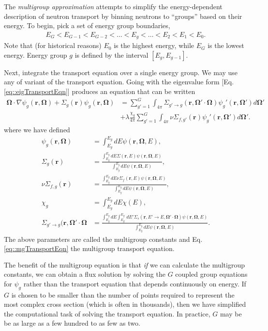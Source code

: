 \documentclass[11pt]{article}
\renewcommand\vec{\mathbf}
\begin{document}
The \emph{multigroup approximation} attempts to simplify the energy-dependent description of neutron transport by binning neutrons to ``groups'' based on their energy.  To begin, pick a set of energy group boundaries, 
\begin{align}
  E_G < E_{G-1} < E_{G-2} < \hdots < E_g < \hdots < E_2 < E_1 < E_0.
\end{align}
Note that (for historical reasons) \(E_0\) is the highest energy, while \(E_G\) is the lowest energy.  Energy group \(g\) is defined by the interval \([E_g, E_{g-1}]\).  

Next, integrate the transport equation over a single energy group.  We may use any of variant of the transport equation.  Going with the eigenvalue form [Eq. \eqref{eq::eigTransportEqn}] produces an equation that can be written
\begin{align}
  \vec{\Omega} \cdot \nabla \psi_g(\vec{r},\vec{\Omega})
  + \Sigma_g(\vec{r}) \psi_g(\vec{r},\vec{\Omega})
  &= \sum_{g'=1}^G \int_{4\pi} \Sigma_{g'\rightarrow g}(\vec{r}, \vec{\Omega}'\cdot\vec{\Omega}) \psi_g'(\vec{r},\vec{\Omega}') d\vec{\Omega}'\\
  &+ \lambda\frac{\chi_g}{4\pi} \sum_{g'=1}^G \int_{4\pi} \nu\Sigma_{f,g'}(\vec{r}) \psi_g'(\vec{r},\vec{\Omega}') d\vec{\Omega}'.
  \label{eq::mgTransportEqn}
\end{align}
where we have defined
\begin{align}
  \psi_g(\vec{r},\vec{\Omega}) &= \int_{E_g}^{E_g} dE \psi(\vec{r},\vec{\Omega},E), \\
  \Sigma_g(\vec{r}) &= \frac{\int_{E_g}^{E_g} dE \Sigma(\vec{r},E) \psi(\vec{r},\vec{\Omega},E)}{\int_{E_g}^{E_g} dE \psi(\vec{r},\vec{\Omega},E)}, \\
  \nu\Sigma_{f,g}(\vec{r}) &= \frac{\int_{E_g}^{E_g} dE \nu\Sigma_f(\vec{r},E) \psi(\vec{r},\vec{\Omega},E)}{\int_{E_g}^{E_g} dE \psi(\vec{r},\vec{\Omega},E)}, \\
  \chi_g &=  \int_{E_g}^{E_g} dE \chi(E), \\
  \Sigma_{g'\rightarrow g}(\vec{r}, \vec{\Omega}'\cdot\vec{\Omega} &= 
    \frac{\int_{E_g}^{E_g} dE \int_{E_{g'}}^{E_{g'}} dE' \Sigma_s(\vec{r},E' \rightarrow E, \vec{\Omega}'\cdot\vec{\Omega}) \psi(\vec{r},\vec{\Omega},E)}{\int_{E_g}^{E_g} dE \psi(\vec{r},\vec{\Omega},E)}.
\end{align}
The above parameters are called the multigroup constants and Eq. \eqref{eq::mgTransportEqn} the multigroup transport equation.  

The benefit of the multigroup equation is that \emph{if} we can calculate the multigroup constants, we can obtain a flux solution by solving the \(G\) coupled group equations for \(\psi_g\) rather than the transport equation that depends continuously on energy.  If \(G\) is chosen to be smaller than the number of points required to represent the most complex cross section (which is often in thousands), then we have simplified the computational task of solving the transport equation.  In practice, \(G\) may be be as large as a few hundred to as few as two.
\end{document}
